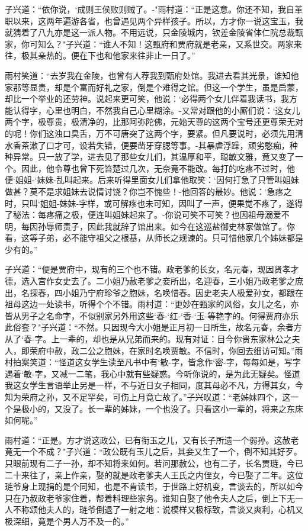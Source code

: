 子兴道：“依你说，`成则王侯败则贼了。-"雨村道：“正是这意。你还不知，我自革职以来，这两年遍游各省，也曾遇见两个异样孩子。所以，方才你一说这宝玉，我就猜着了八九亦是这一派人物。不用远说，只金陵城内，钦差金陵省体仁院总裁甄家，你可知么？"子兴道：“谁人不知！这甄府和贾府就是老亲，又系世交。两家来往，极其亲热的。便在下也和他家来往非止一日了。”

雨村笑道：“去岁我在金陵，也曾有人荐我到甄府处馆。我进去看其光景，谁知他家那等显贵，却是个富而好礼之家，倒是个难得之馆。但这一个学生，虽是启蒙，却比一个举业的还劳神。说起来更可笑，他说：`必得两个女儿伴着我读书，我方能认得字，心里也明白，不然我自己心里糊涂。-又常对跟他的小厮们说：`这女儿两个字，极尊贵，极清净的，比那阿弥陀佛，元始天尊的这两个宝号还更尊荣无对的呢！你们这浊口臭舌，万不可唐突了这两个字，要紧。但凡要说时，必须先用清水香茶漱了口才可，设若失错，便要凿牙穿腮等事。-其暴虐浮躁，顽劣憨痴，种种异常。只一放了学，进去见了那些女儿们，其温厚和平，聪敏文雅，竟又变了一个。因此，他令尊也曾下死笞楚过几次，无奈竟不能改。每打的吃疼不过时，他便`姐姐-`妹妹-乱叫起来。后来听得里面女儿们拿他取笑：`因何打急了只管叫姐妹做甚？莫不是求姐妹去说情讨饶？你岂不愧些！-他回答的最妙。他说：`急疼之时，只叫`姐姐-妹妹-字样，或可解疼也未可知，因叫了一声，便果觉不疼了，遂得了秘法：每疼痛之极，便连叫姐妹起来了。-你说可笑不可笑？也因祖母溺爱不明，每因孙辱师责子，因此我就辞了馆出来。如今在这巡盐御史林家做馆了。你看，这等子弟，必不能守祖父之根基，从师长之规谏的。只可惜他家几个姊妹都是少有的。”

子兴道：“便是贾府中，现有的三个也不错。政老爹的长女，名元春，现因贤孝才德，选入宫作女史去了。二小姐乃赦老爹之妾所出，名迎春，三小姐乃政老爹之庶出，名探春，四小姐乃宁府珍爷之胞妹，名唤惜春。因史老夫人极爱孙女，都跟在祖母这边一处读书，听得个个不错。雨村道：“更妙在甄家的风俗，女儿之名，亦皆从男子之名命字，不似别家另外用这些`春-`红-`香-`玉-等艳字的。何得贾府亦乐此俗套？"子兴道：“不然。只因现今大小姐是正月初一日所生，故名元春，余者方从了`春-字。上一辈的，却也是从兄弟而来的。现有对证：目今你贵东家林公之夫人，即荣府中赦，政二公之胞妹，在家时名唤贾敏。不信时，你回去细访可知。”雨村拍案笑道：“怪道这女学生读至凡书中有`敏-字，皆念作`密-字，每每如是，写字遇着`敏-字，又减一二笔，我心中就有些疑惑。今听你说的，是为此无疑矣。怪道我这女学生言语举止另是一样，不与近日女子相同，度其母必不凡，方得其女，今知为荣府之孙，又不足罕矣，可伤上月竟亡故了。”子兴叹道：“老姊妹四个，这一个是极小的，又没了。长一辈的姊妹，一个也没了。只看这小一辈的，将来之东床如何呢。”

雨村道：“正是。方才说这政公，已有衔玉之儿，又有长子所遗一个弱孙。这赦老竟无一个不成？"子兴道：“政公既有玉儿之后，其妾又生了一个，倒不知其好歹。只眼前现有二子一孙，却不知将来如何。若问那赦公，也有二子，长名贾琏，今已二十来往了，亲上作亲，娶的就是政老爹夫人王氏之内侄女，今已娶了二年。这位琏爷身上现捐的是个同知，也是不肯读书，于世路上好机变，言谈去的，所以如今只在乃叔政老爷家住着，帮着料理些家务。谁知自娶了他令夫人之后，倒上下无一人不称颂他夫人的，琏爷倒退了一射之地：说模样又极标致，言谈又爽利，心机又极深细，竟是个男人万不及一的。”

